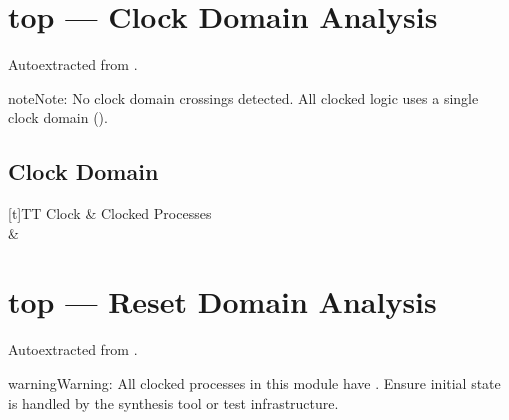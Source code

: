 \documentclass[letterpaper,10pt,english]{sphinxmanual}
\begin{document}
\sphinxstepscope


\section{top — Clock Domain Analysis}
\label{\detokenize{modules/top/cdc:top-clock-domain-analysis}}\label{\detokenize{modules/top/cdc::doc}}
\sphinxAtStartPar
Auto\sphinxhyphen{}extracted from .

\begin{sphinxadmonition}{note}{Note:}
\sphinxAtStartPar
No clock domain crossings detected. All clocked logic uses a single clock domain ().
\end{sphinxadmonition}


\subsection{Clock Domain}
\label{\detokenize{modules/top/cdc:clock-domain}}

\begin{savenotes}\sphinxattablestart
\sphinxthistablewithglobalstyle
\centering
\begin{tabulary}{\linewidth}[t]{TT}
\sphinxtoprule
\sphinxstyletheadfamily 
\sphinxAtStartPar
Clock
&\sphinxstyletheadfamily 
\sphinxAtStartPar
Clocked Processes
\\
\sphinxmidrule
\sphinxtableatstartofbodyhook
\sphinxAtStartPar
{}
&
\sphinxAtStartPar
{}
\\
\sphinxbottomrule
\end{tabulary}
\sphinxtableafterendhook\par
\sphinxattableend\end{savenotes}

\sphinxstepscope


\section{top — Reset Domain Analysis}
\label{\detokenize{modules/top/reset:top-reset-domain-analysis}}\label{\detokenize{modules/top/reset::doc}}
\sphinxAtStartPar
Auto\sphinxhyphen{}extracted from .

\begin{sphinxadmonition}{warning}{Warning:}
\sphinxAtStartPar
All clocked processes in this module have . Ensure initial state is handled by the synthesis tool or test infrastructure.
\end{sphinxadmonition}
\end{document}
